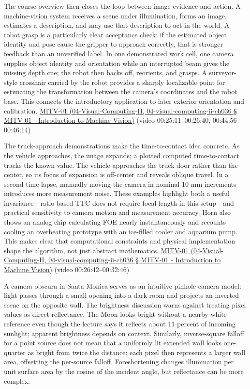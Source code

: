 The course overview then closes the loop between image evidence and action. A machine-vision system receives a scene under illumination, forms an image, estimates a description, and may use that description to act in the world. A robot grasp is a particularly clear acceptance check: if the estimated object identity and pose cause the gripper to approach correctly, that is stronger feedback than an unverified label. In one demonstrated work cell, one camera supplies object identity and orientation while an interrupted beam gives the missing depth cue; the robot then backs off, reorients, and grasps. A surveyor-style crosshair carried by the robot provides a sharply localizable point for estimating the transformation between the camera's coordinates and the robot base. This connects the introductory application to later exterior orientation and calibration. \href{}{MITV-01 (04-Visual-Computing-II, 04-visual-computing-ii-ch036 § MITV-01 - Introduction to Machine Vision)} (video 00:25:11--00:26:40, 00:44:56--00:46:14)

The truck-approach demonstrations make the time-to-contact idea concrete. As the vehicle approaches, the image expands; a plotted computed time-to-contact tracks the known value. The vehicle approaches the truck door rather than the center, so its focus of expansion is off-center and reveals oblique travel. In a second time-lapse, manually moving the camera in nominal 10 mm increments introduces more measurement noise. These examples highlight both a useful invariance---ratio-based TTC does not require focal length in this setup---and practical sensitivity to camera motion and measurement accuracy. Horn also shows an analog chip calculating FOE nearly instantaneously and recounts cooling an overheating prototype with an ice-filled cooler and aquarium pump. This makes clear that computational constraints and physical implementation shape the algorithm, not just abstract mathematics. \href{}{MITV-01 (04-Visual-Computing-II, 04-visual-computing-ii-ch036 § MITV-01 - Introduction to Machine Vision)} (video 00:26:42--00:32:46)

A camera obscura in Santa Monica serves as an intuitive pinhole-camera model: light passes through a small opening into a dark room and projects an inverted scene on the opposite wall. The brightness discussion warns against treating pixel values as direct reflectance. The Moon looks bright without a nearby white reference even though the lecture says it reflects about 11 percent of incoming sunlight; apparent brightness depends on context. Similarly, inverse-square falloff for a point source does not mean that a uniformly lit extended wall looks one-quarter as bright from twice the distance: each pixel then represents a larger wall area, offsetting the per-source falloff. Foreshortening changes illumination per unit surface area by the cosine of the incident angle, but reflectance can be more complex.

